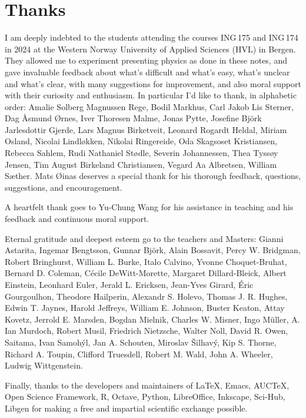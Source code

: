 \documentclass[a4paper,12pt,%
onecolumn,oneside,%
british%
]{memoir}
\newcommand{\addsec}[1]{\section*{#1}\addcontentsline{toc}{section}{#1}}
\renewcommand*{\|}[1][]{\nonscript\:#1\vert\nonscript\:\mathopen{}}
\begin{document}
\iftrue
\addsec{Thanks}
\label{sec:thanks}

I am deeply indebted to the students attending the courses ING\,175 and ING\,174 in 2024 at the Western Norway University of Applied Sciences (HVL) in Bergen. They allowed me to experiment presenting physics as done in these notes, and gave invaluable feedback about what's difficult and what's easy, what's unclear and what's clear, with many suggestions for improvement, and also moral support with their curiosity and enthusiasm. In particular I'd like to thank, in alphabetic order: %
Amalie Solberg Magnussen Rege, %
Bodil Markhus, %
Carl Jakob Lis Sterner, %
Dag Åsmund Ørnes, %
Iver Thoresen Malme, %
Jonas Pytte, %
Josefine Björk Jarlesdottir Gjerde, %
Lars Magnus Birketveit, %
Leonard Rogardt Heldal, %
Miriam Osland, %
Nicolai Lindløkken, %
Nikolai Ringereide, %
Oda Skagsoset Kristiansen, %
Rebecca Sahlem, %
Rudi Nathaniel Stødle, %
Severin Johannessen, %
Thea Tyssøy Jensen, %
Tim August Birkeland Christiansen, %
Vegard Aa Albretsen, %
William Sæther. %
Mats Øinas deserves a special thank for his thorough feedback, questions, suggestions, and encouragement.

A heartfelt thank goes to Yu-Chung Wang for his assistance in teaching and his feedback and continuous moral support.

Eternal gratitude and deepest esteem go to the teachers and Masters:
Gianni Astarita,
Ingemar Bengtsson,
Gunnar Bj{\"o}rk,
Alain Bossavit,
Percy W. Bridgman,
Robert Bringhurst,
William L. Burke,
Italo Calvino,
Yvonne Choquet-Bruhat,
Bernard D. Coleman,
C{\'e}cile DeWitt-Morette,
Margaret Dillard-Bleick,
Albert Einstein,
Leonhard Euler,
Jerald L. Ericksen,
Jean-Yves Girard,
{\'E}ric Gourgoulhon,
Theodore Hailperin,
Alexandr S. Holevo,
Thomas J. R. Hughes,
Edwin T. Jaynes,
Harold Jeffreys,
William E. Johnson,
Buster Keaton,
Attay Kovetz,
Jerrold E. Marsden,
Bogdan Mielnik,
Charles W. Misner,
Ingo M\"uller,
A. Ian Murdoch,
Robert Musil,
Friedrich Nietzsche,
Walter Noll,
David R. Owen,
Saitama,
Ivan Samoh{\'y}l,
Jan A. Schouten,
Miroslav {\v{S}}ilhav{\'y},
Kip S. Thorne,
Richard A. Toupin,
Clifford Truesdell,
Robert M. Wald,
John A. Wheeler,
Ludwig Wittgenstein.

Finally, thanks to the developers and maintainers of \LaTeX, Emacs, AUC\TeX, Open Science Framework, R, Octave, Python, LibreOffice, Inkscape, Sci-Hub, Libgen for making a free and impartial scientific exchange possible.
\fi
\end{document}
